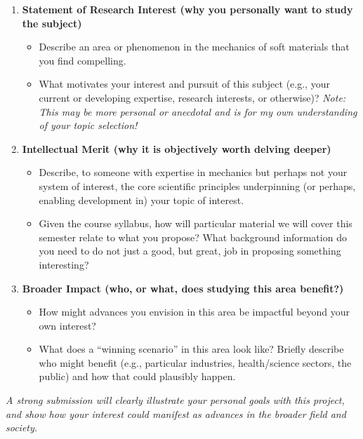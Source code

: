 \begin{enumerate}
\item \textbf{Statement of Research Interest (why you personally want to study the subject)}
\begin{itemize}
\item Describe an area or phenomenon in the mechanics of soft materials that you find compelling. 
\item What motivates your interest and pursuit of this subject (e.g., your current or developing expertise, research interests, or otherwise)? \textit{Note: This may be more personal or anecdotal and is for my own understanding of your topic selection!}
\end{itemize}
\item \textbf{Intellectual Merit (why it is objectively worth delving deeper)}
\begin{itemize}
\item Describe, to someone with expertise in mechanics but perhaps not your system of interest, the core scientific principles underpinning (or perhaps, enabling development in) your topic of interest. 
\item Given the course syllabus, how will particular material we will cover this semester relate to what you propose? What background information do you need to do not just a good, but great, job in proposing something interesting? 
\end{itemize}
\item \textbf{Broader Impact (who, or what, does studying this area benefit?)}
\begin{itemize}
\item How might advances you envision in this area be impactful beyond your own interest? 
\item What does a ``winning scenario'' in this area look like? Briefly describe who might benefit (e.g., particular industries, health/science sectors, the public) and how that could plausibly happen.
\end{itemize}
\end{enumerate}

\emph{A strong submission will clearly illustrate your personal goals with this project, and show how your interest could manifest as advances in the broader field and society.}





